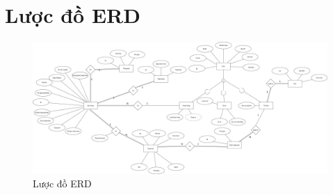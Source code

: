 \chapter{Lược đồ ERD}\label{chap:ERD}
	\begin{figure}[!ht]
		\includegraphics[width=1\textwidth]{Images/erd.jpg}
		\centering
		\linebreak
		\caption{Lược đồ ERD}
	\end{figure}